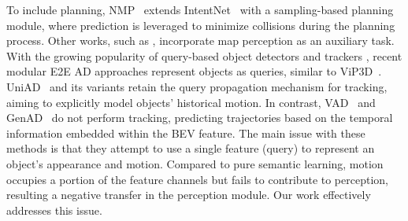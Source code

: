 To include planning, NMP~\cite{zeng2019end} extends IntentNet~\cite{casas2018intentnet} with a sampling-based planning module, where prediction is leveraged to minimize collisions during the planning process. Other works, such as \cite{chitta2021neat, casas2021mp3, hu2022st}, incorporate map perception as an auxiliary task. With the growing popularity of query-based object detectors \cite{carion2020end, li2022bevformer} and trackers \cite{zeng2022motr, meinhardt2022trackformer}, recent modular \gls{E2E} \gls{AD} approaches represent objects as queries, similar to ViP3D~\cite{gu2023vip3d}. UniAD~\cite{hu2023planning} and its variants \cite{doll2024dualad, weng2024drive} retain the query propagation mechanism for tracking, aiming to explicitly model objects' historical motion. In contrast, VAD~\cite{jiang2023vad} and GenAD~\cite{zheng2025genad} do not perform tracking, predicting trajectories based on the temporal information embedded within the \gls{BEV} feature. The main issue with these methods is that they attempt to use a single feature (query) to represent an object's appearance and motion. Compared to pure semantic learning, motion occupies a portion of the feature channels but fails to contribute to perception, resulting a negative transfer in the perception module. Our work effectively addresses this issue.
